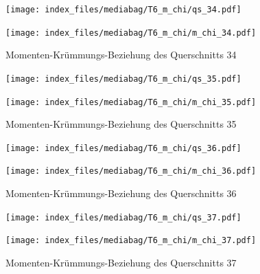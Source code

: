 \documentclass[
  11pt,
  letterpaper,
]{scrreprt}
\begin{document}
\begin{figure}[H]

\begin{minipage}{0.50\linewidth}
\texttt{[image: index\_files/mediabag/T6\_m\_chi/qs\_34.pdf]}\end{minipage}%
%
\begin{minipage}{0.50\linewidth}
\texttt{[image: index\_files/mediabag/T6\_m\_chi/m\_chi\_34.pdf]}\end{minipage}%

\caption{\label{fig-mchi_anhang}Momenten-Krümmungs-Beziehung des
Querschnitts 34}

\end{figure}%

\begin{figure}[H]

\begin{minipage}{0.50\linewidth}
\texttt{[image: index\_files/mediabag/T6\_m\_chi/qs\_35.pdf]}\end{minipage}%
%
\begin{minipage}{0.50\linewidth}
\texttt{[image: index\_files/mediabag/T6\_m\_chi/m\_chi\_35.pdf]}\end{minipage}%

\caption{\label{fig-mchi_anhang}Momenten-Krümmungs-Beziehung des
Querschnitts 35}

\end{figure}%

\begin{figure}[H]

\begin{minipage}{0.50\linewidth}
\texttt{[image: index\_files/mediabag/T6\_m\_chi/qs\_36.pdf]}\end{minipage}%
%
\begin{minipage}{0.50\linewidth}
\texttt{[image: index\_files/mediabag/T6\_m\_chi/m\_chi\_36.pdf]}\end{minipage}%

\caption{\label{fig-mchi_anhang}Momenten-Krümmungs-Beziehung des
Querschnitts 36}

\end{figure}%

\begin{figure}[H]

\begin{minipage}{0.50\linewidth}
\texttt{[image: index\_files/mediabag/T6\_m\_chi/qs\_37.pdf]}\end{minipage}%
%
\begin{minipage}{0.50\linewidth}
\texttt{[image: index\_files/mediabag/T6\_m\_chi/m\_chi\_37.pdf]}\end{minipage}%

\caption{\label{fig-mchi_anhang}Momenten-Krümmungs-Beziehung des
Querschnitts 37}

\end{figure}%
\end{document}
